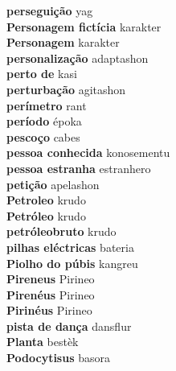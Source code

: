 \textbf{ perseguição  } yag \\
\textbf{ Personagem fictícia  } karakter \\
\textbf{ Personagem  } karakter \\
\textbf{ personalização  } adaptashon \\
\textbf{ perto de  } kasi \\
\textbf{ perturbação  } agitashon \\
\textbf{ perímetro  } rant \\
\textbf{ período  } époka \\
\textbf{ pescoço  } cabes \\
\textbf{ pessoa conhecida  } konosementu \\
\textbf{ pessoa estranha  } estranhero \\
\textbf{ petição  } apelashon \\
\textbf{ Petroleo  } krudo \\
\textbf{ Petróleo  } krudo \\
\textbf{ petróleobruto  } krudo \\
\textbf{ pilhas eléctricas  } bateria \\
\textbf{ Piolho do púbis  } kangreu \\
\textbf{ Pireneus  } Pirineo \\
\textbf{ Pirenéus  } Pirineo \\
\textbf{ Pirinéus  } Pirineo \\
\textbf{ pista de dança  } dansflur \\
\textbf{ Planta  } bestèk \\
\textbf{ Podocytisus  } basora \\
